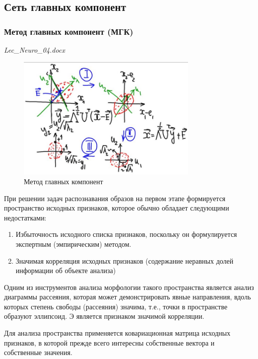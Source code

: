 \documentclass[a4paper]{article}
\numberwithin{equation}{subsection}
\begin{document}
\subsection{Сеть главных компонент}

\subsubsection{Метод главных компонент (МГК)}

\begin{myquote}
    \textit{Lec\_Neuro\_04.docx}
\end{myquote}

\begin{figure}[htbp]
    \centering
    \includegraphics[height=6cm]{hyperflat_11_1.jpeg}
    \caption{Метод главных компонент}
    \label{hyperflat_11_1}
\end{figure}

При решении задач распознавания образов на первом этапе формируется пространство 
исходных признаков, которое обычно обладает  следующими недостатками:

\begin{enumerate}
    \item Избыточность исходного списка признаков, поскольку он формулируется экспертным 
    (эмпирическим) методом.
    \item Значимая корреляция исходных признаков (содержание неравных долей информации
    об объекте анализа)
\end{enumerate}

Одним из инструментов анализа морфологии такого пространства является анализ диаграммы рассеяния,
которая может демонстрировать явные направления, вдоль которых степень свободы (рассеяния)
значима, т.е., точки в пространстве образуют эллипсоид. Э является признаком значимой корреляции.

Для анализа пространства применяется ковариационная матрица исходных признаков, в которой 
прежде всего интересны собственные вектора и собственные значения.
\end{document}
